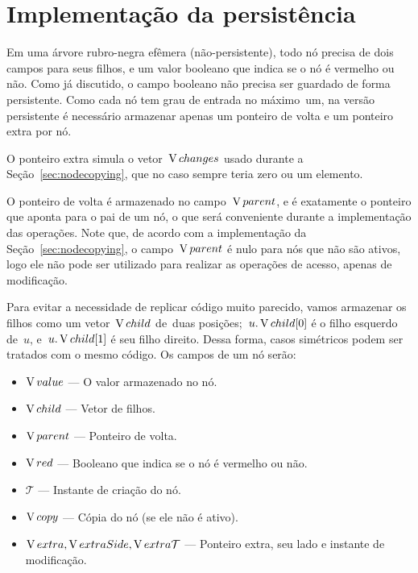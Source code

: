\documentclass[main.tex]{subfiles}
\begin{document}
\section{Implementação da persistência}

\newcommand{\ts}{\mathcal{T}}
\newcommand{\cp}{\V{copy}}
\newcommand{\child}{\V{child}}
\newcommand{\parent}{\V{parent}}
\newcommand{\red}{\V{red}}
\newcommand{\extra}{\V{extra}}
\newcommand{\eSide}{\V{extraSide}}
\newcommand{\eTs}{\V{extra\mathcal{T}}}
\newcommand{\version}{\V{version}}
\newcommand{\side}{\V{side}}
\newcommand{\roots}{\V{roots}}
\newcommand{\val}{\V{value}}
\newcommand{\cur}{\V{current}}


Em uma árvore rubro-negra efêmera (não-persistente), todo nó precisa de dois campos para seus filhos, e um valor booleano que indica se o nó é vermelho ou não. Como já discutido, o campo booleano não precisa ser guardado de forma persistente. Como cada nó tem grau de entrada no máximo~um, na versão persistente é necessário armazenar apenas um ponteiro de volta e um ponteiro extra por nó.

O ponteiro extra simula o vetor~$\operatorname{V}{changes}$ usado durante a Seção~\ref{sec:nodecopying}, que no caso sempre teria zero ou um elemento.

O ponteiro de volta é armazenado no campo~$\parent$, e é exatamente o ponteiro que aponta para o pai de um nó, o que será conveniente durante a implementação das operações. Note que, de acordo com a implementação da Seção~\ref{sec:nodecopying}, o campo~$\parent$ é nulo para nós que não são ativos, logo ele não pode ser utilizado para realizar as operações de acesso, apenas de modificação.

Para evitar a necessidade de replicar código muito parecido, vamos armazenar os filhos como um vetor~$\child$ de~duas posições;~$u.\child[0]$ é o filho esquerdo de~$u$, e~$u.\child[1]$ é seu filho direito. Dessa forma, casos simétricos podem ser tratados com o mesmo código. Os campos de um nó serão:
\begin{itemize}
\item $\val$ --- O valor armazenado no nó.
\item $\child$ --- Vetor de filhos.
\item $\parent$ --- Ponteiro de volta.
\item $\red$ --- Booleano que indica se o nó é vermelho ou não.
\item $\ts$ --- Instante de criação do nó.
\item $\cp$ --- Cópia do nó (se ele não é ativo).
\item $\extra, \eSide, \eTs$ --- Ponteiro extra, seu lado e instante de modificação.
\end{itemize}
\end{document}
